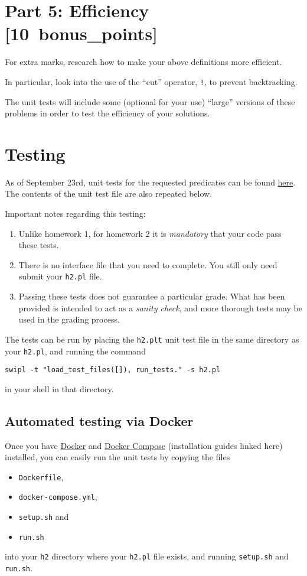 \documentclass[11pt]{article}
\begin{document}
\section*{Part 5: Efficiency                                     [10 bonus\_points]}
\label{sec:org399aec2}
For extra marks, research how to make your above definitions more efficient.

In particular, look into the use of the “cut” operator, \texttt{!},
to prevent backtracking.

The unit tests will include some (optional for your use) “large”
versions of these problems in order to test the efficiency
of your solutions.

\section*{Testing}
\label{sec:org630db39}
As of September 23rd, unit tests for the requested predicates
can be found \href{./testing/h2/h2.plt}{here}. The contents of the unit test file are also repeated below.

Important notes regarding this testing:
\begin{enumerate}
\item Unlike homework 1, for homework 2 it is \emph{mandatory}
that your code pass these tests.
\item There is no interface file that you need to complete.
You still only need submit your \texttt{h2.pl} file.
\item Passing these tests does not guarantee a particular grade.
What has been provided is intended to act as a \emph{sanity check},
and more thorough tests may be used in the grading process.
\end{enumerate}

The tests can be run by placing the \texttt{h2.plt} unit test file
in the same directory as your \texttt{h2.pl}, and running the command
\begin{verbatim}
swipl -t "load_test_files([]), run_tests." -s h2.pl
\end{verbatim}
in your shell in that directory.

\subsection*{Automated testing via Docker}
\label{sec:org100e073}
Once you have \href{https://docs.docker.com/get-docker/}{Docker}
and \href{https://docs.docker.com/compose/install/}{Docker Compose}
(installation guides linked here)
installed, you can easily run the unit tests
by copying the files
\begin{itemize}
\item \texttt{Dockerfile},
\item \texttt{docker-compose.yml},
\item \texttt{setup.sh} and
\item \texttt{run.sh}
\end{itemize}
into your \texttt{h2} directory where your \texttt{h2.pl} file exists,
and running \texttt{setup.sh} and \texttt{run.sh}.
\end{document}
